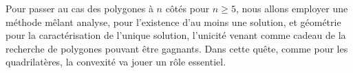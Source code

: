 Pour passer au cas des polygones à $n$ côtés pour $n \geq 5$, nous allons employer une méthode mêlant analyse, pour l'existence d'au moins une solution, et géométrie pour la caractérisation de l'unique solution, l'unicité venant comme cadeau de la recherche de polygones pouvant être gagnants.
%
Dans cette quête, comme pour les quadrilatères, la convexité va jouer un rôle essentiel.

